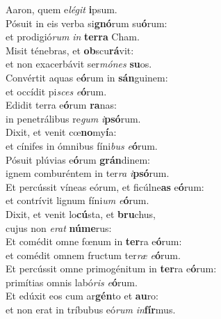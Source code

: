 \oddverse Aaron, quem e\textit{lé}\textit{git} \textbf{i}psum.\\
\evenverse Pósuit in eis verba si\textbf{gnó}rum su\textbf{ó}rum:~\*\\
\evenverse et prodigió\textit{rum} \textit{in} \textbf{ter}\textbf{ra} Cham.\\
\oddverse Misit ténebras, et \textbf{ob}scu\textbf{rá}vit:~\*\\
\oddverse et non exacerbávit ser\textit{mó}\textit{nes} \textbf{su}os.\\
\evenverse Convértit aquas e\textbf{ó}rum in \textbf{sán}guinem:~\*\\
\evenverse et occídit pi\textit{sces} \textit{e}\textbf{ó}rum.\\
\oddverse Edidit terra e\textbf{ó}rum \textbf{ra}nas:~\*\\
\oddverse in penetrálibus re\textit{gum} \textit{i}\textbf{psó}rum.\\
\evenverse Dixit, et venit cœ\textbf{no}my\textbf{í}a:~\*\\
\evenverse et cínifes in ómnibus fíni\textit{bus} \textit{e}\textbf{ó}rum.\\
\oddverse Pósuit plúvias e\textbf{ó}rum \textbf{grán}dinem:~\*\\
\oddverse ignem comburéntem in ter\textit{ra} \textit{i}\textbf{psó}rum.\\
\evenverse Et percússit víneas eórum, et ficúlne\textbf{as} e\textbf{ó}rum:~\*\\
\evenverse et contrívit lignum fíni\textit{um} \textit{e}\textbf{ó}rum.\\
\oddverse Dixit, et venit lo\textbf{cú}sta, et \textbf{bru}chus,~\*\\
\oddverse cujus non \textit{e}\textit{rat} \textbf{nú}\textbf{me}rus:\\
\evenverse Et comédit omne fœnum in \textbf{ter}ra e\textbf{ó}rum:~\*\\
\evenverse et comédit omnem fructum ter\textit{ræ} \textit{e}\textbf{ó}rum.\\
\oddverse Et percússit omne primogénitum in \textbf{ter}ra e\textbf{ó}rum:~\*\\
\oddverse primítias omnis labó\textit{ris} \textit{e}\textbf{ó}rum.\\
\evenverse Et edúxit eos cum ar\textbf{gén}to et \textbf{au}ro:~\*\\
\evenverse et non erat in tríbubus eó\textit{rum} \textit{in}\textbf{fír}mus.\\
